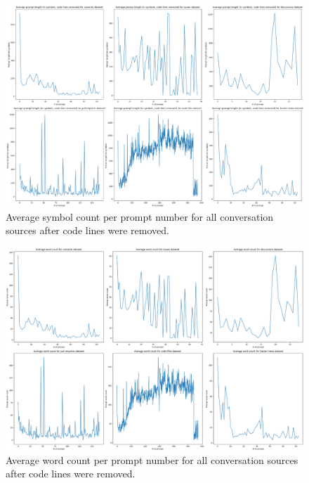 \begin{figure}[H]
    \centering
    \includegraphics[width=\textwidth]{imgs/symbols-per-prompt.png}
    \caption{Average symbol count per prompt number for all conversation sources after code lines were removed.}
    \label{fig:symbols-per-prompt}
\end{figure}

\begin{figure}[H]
    \centering
    \includegraphics[width=\textwidth]{imgs/word-count-per-prompt.png}
    \caption{Average word count per prompt number for all conversation sources after code lines were removed.}
    \label{fig:words-per-prompt}
\end{figure}

